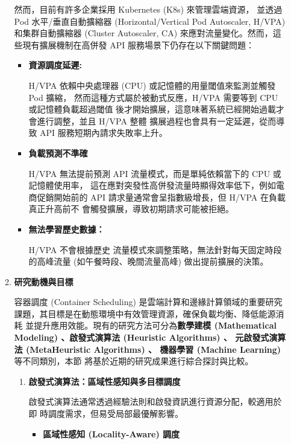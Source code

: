 \documentclass[12pt,a4paper]{article}
\begin{document}
\begin{enumerate}[label={(\zhdig*)}, leftmargin=2\parindent, listparindent=\parindent]
\begin{enumerate}[label={(\arabic*)}, leftmargin=\parindent, listparindent=\parindent]
然而，目前有許多企業採用 Kubernetes (K8s) 來管理雲端資源，
並透過 Pod 水平/垂直自動擴縮器
(Horizontal/Vertical Pod Autoscaler, H/VPA)
和集群自動擴縮器 (Cluster Autoscaler, CA)
來應對流量變化。然而，這些現有擴展機制在高併發 API
服務場景下仍存在以下關鍵問題\cite{7}：
\begin{itemize}[leftmargin=\parindent, listparindent=\parindent]
    \item\textbf{資源調度延遲:}

H/VPA 依賴中央處理器 (CPU) 或記憶體的用量閾值來監測並觸發 Pod 擴縮，
然而這種方式屬於被動式反應，H/VPA 需要等到 CPU 或記憶體負載超過閾值
後才開始擴展，這意味著系統已經開始過載才會進行調整，並且 H/VPA 整體
擴展過程也會具有一定延遲，從而導致 API 服務短期內請求失敗率上升。

    \item \textbf{
負載預測不準確
}

H/VPA 無法提前預測 API 流量模式，而是單純依賴當下的 CPU 或記憶體使用率，
這在應對突發性高併發流量時顯得效率低下，例如電商促銷開始前的
API 請求量通常會呈指數級增長，但 H/VPA 在負載真正升高前不
會觸發擴展，導致初期請求可能被拒絕。

\item \textbf{無法學習歷史數據：}

H/VPA 不會根據歷史 流量模式來調整策略，無法針對每天固定時段的高峰流量 (如午餐時段、晚間流量高峰)
做出提前擴展的決策。

    \end{itemize}
    \item \textbf{研究動機與目標}

容器調度 (Container Scheduling) 是雲端計算和邊緣計算領域的重要研究
課題，其目標是在動態環境中有效管理資源，確保負載均衡、降低能源消耗
並提升應用效能。現有的研究方法\cite{11}可分為\textbf{數學建模 (Mathematical
Modeling) 、啟發式演算法 (Heuristic Algorithms) 、
元啟發式演算法 (MetaHeuristic Algorithms) 、
機器學習 (Machine Learning) }等不同類別，本節
將基於近期的研究成果進行綜合探討與比較。

\begin{enumerate}[label={(\zhdig*)}, leftmargin=\parindent, listparindent=\parindent]

\item \textbf{啟發式演算法：區域性感知與多目標調度}

啟發式演算法通常透過經驗法則和啟發資訊進行資源分配，較適用於即
時調度需求，但易受局部最優解影響。
\begin{itemize}[leftmargin=\parindent, listparindent=\parindent]
    \item \textbf{
        \cite{12} 區域性感知 (Locality-Aware) 調度}


\end{itemize}
\end{enumerate}
\end{enumerate}
\end{enumerate}
\end{document}
